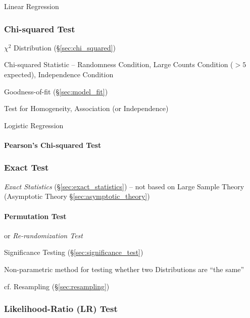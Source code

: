 Linear Regression



\subsubsection{Chi-squared Test}\label{sec:chi_squared_test}

$\chi^2$ Distribution (\S\ref{sec:chi_squared})

Chi-squared Statistic -- Randomness Condition, Large Counts Condition ($>5$
expected), Independence Condition

Goodness-of-fit (\S\ref{sec:model_fit})

Test for Homogeneity, Association (or Independence)

Logistic Regression



\paragraph{Pearson's Chi-squared Test}\label{sec:pearsons_chi_squared}\hfill



\subsubsection{Exact Test}\label{sec:exact_test}

\emph{Exact Statistics} (\S\ref{sec:exact_statistics}) -- not based on Large
Sample Theory (Asymptotic Theory \S\ref{sec:asymptotic_theory})



\paragraph{Permutation Test}\label{sec:permutation_test}\hfill

or \emph{Re-randomization Test}

Significance Testing (\S\ref{sec:significance_test})

Non-parametric method for testing whether two Distributions are ``the same''

\fist cf. Resampling (\S\ref{sec:resampling})



\subsubsection{Likelihood-Ratio (LR) Test}\label{sec:lr_test}

